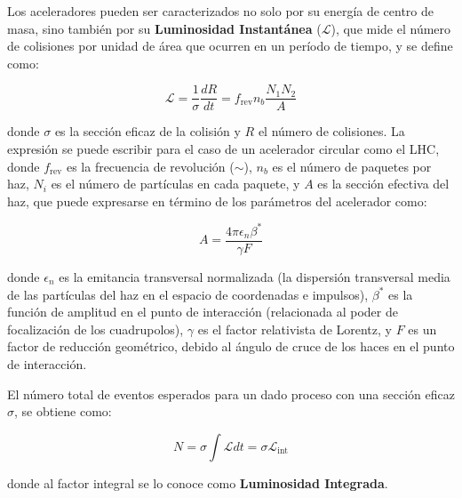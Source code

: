 Los aceleradores pueden ser caracterizados no solo por su energía de centro de masa, sino también por su \textbf{Luminosidad Instantánea} ($\mathcal{L}$), que mide el número de colisiones por unidad de área que ocurren en un período de tiempo, y se define como: 

\begin{equation}
\mathcal{L}= \frac{1}{\sigma}\frac{dR}{dt} = f_{\text{rev}}n_{b}\frac{N_{1}N_{2}}{A}
\end{equation}

\noindent
donde $\sigma$ es la sección eficaz de la colisión y $R$ el número de colisiones. La expresión se puede escribir para el caso de un acelerador circular como el LHC, donde $f_{\text{rev}}$ es la frecuencia de revolución ($\sim$), $n_{b}$ es el número de paquetes por haz, $N_{i}$ es el número de partículas en cada paquete, y $A$ es la sección efectiva del haz, que puede expresarse en término de los parámetros del acelerador como:

\begin{equation}
A=\frac{4 \pi \epsilon_{n}\beta^{*}}{\gamma F}
\end{equation} 

\noindent
donde $\epsilon_{n}$ es la emitancia transversal normalizada (la dispersión transversal media de las partículas del haz en el espacio de coordenadas e impulsos), $\beta^{*}$ es la función de amplitud en el punto de interacción (relacionada al poder de focalización de los cuadrupolos), $\gamma$ es el factor relativista de Lorentz, y $F$ es un factor de reducción geométrico, debido al ángulo de cruce de los haces en el punto de interacción.

El número total de eventos esperados para un dado proceso con una sección eficaz $\sigma$, se obtiene como:

\begin{equation}
N=\sigma \int \mathcal{L} dt = \sigma \mathcal{L}_{\text{int}}
\label{eq:lumi_xs}
\end{equation}	

\noindent
donde al factor integral se lo conoce como \textbf{Luminosidad Integrada}.

